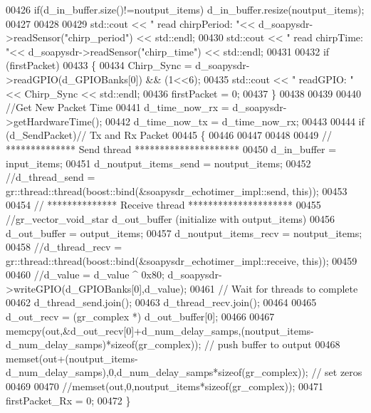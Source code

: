 \begin{DoxyCode}
00426       \textcolor{keywordflow}{if}(d_in_buffer.size()!=noutput\_items) d_in_buffer.resize(noutput\_items);
00427 
00428 
00429       std::cout << \textcolor{stringliteral}{" read chirpPeriod: "}<< d_soapysdr->readSensor(\textcolor{stringliteral}{"chirp\_period"}) << std::endl;
00430       std::cout << \textcolor{stringliteral}{" read chirpTime: "}<< d_soapysdr->readSensor(\textcolor{stringliteral}{"chirp\_time"}) << std::endl;
00431 
00432       \textcolor{keywordflow}{if} (firstPacket)
00433       \{
00434         Chirp_Sync = d_soapysdr->readGPIO(d_GPIOBanks[0]) && (1<<6);
00435         std::cout << \textcolor{stringliteral}{" readGPIO: "} << Chirp_Sync << std::endl;
00436         firstPacket = 0;
00437       \}
00438 
00439 
00440       \textcolor{comment}{//Get New Packet Time}
00441       d_time_now_rx = d_soapysdr->getHardwareTime();
00442       d_time_now_tx = d_time_now_rx;
00443 
00444       \textcolor{keywordflow}{if} (d_SendPacket)\textcolor{comment}{// Tx and Rx Packet}
00445       \{
00446 
00447 
00448 
00449         \textcolor{comment}{// ************** Send thread *********************}
00450         d_in_buffer = input\_items;
00451         d_noutput_items_send = noutput\_items;
00452         \textcolor{comment}{//d\_thread\_send = gr::thread::thread(boost::bind(&soapysdr\_echotimer\_impl::send, this));}
00453 
00454         \textcolor{comment}{// ************** Receive thread *********************}
00455         \textcolor{comment}{//gr\_vector\_void\_star d\_out\_buffer (initialize with output\_items)}
00456         d_out_buffer = output\_items;
00457         d_noutput_items_recv = noutput\_items;
00458         \textcolor{comment}{//d\_thread\_recv = gr::thread::thread(boost::bind(&soapysdr\_echotimer\_impl::receive, this));}
00459 
00460         \textcolor{comment}{//d\_value = d\_value ^ 0x80; d\_soapysdr->writeGPIO(d\_GPIOBanks[0],d\_value);}
00461         \textcolor{comment}{// Wait for threads to complete}
00462         d_thread_send.join();
00463         d_thread_recv.join();
00464 
00465         d_out_recv = (gr\_complex *) d_out_buffer[0];
00466 
00467         memcpy(out,&d_out_recv[0]+d_num_delay_samps,(noutput\_items-
      d_num_delay_samps)*\textcolor{keyword}{sizeof}(gr\_complex)); \textcolor{comment}{// push buffer to output}
00468         memset(out+(noutput\_items-d_num_delay_samps),0,d_num_delay_samps*\textcolor{keyword}{sizeof}(gr\_complex)); \textcolor{comment}{// set zeros}
00469 
00470         \textcolor{comment}{//memset(out,0,noutput\_items*sizeof(gr\_complex));}
00471         firstPacket_Rx = 0;
00472       \}

\end{DoxyCode}
